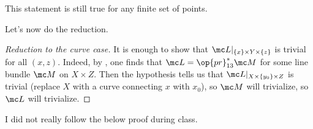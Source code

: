 \documentclass[../notes.tex]{subfiles}
\begin{document}
\begin{remark}
	This statement is still true for any finite set of points.
\end{remark}
Let's now do the reduction.
\begin{proof}[Reduction to the curve case]
	It is enough to show that $\mc L|_{\{x\}\times Y\times\{z\}}$ is trivial for all $(x,z)$. Indeed, by , one finds that $\mc L=\op{pr}_{13}^*\mc M$ for some line bundle $\mc M$ on $X\times Z$. Then the hypothesis tells us that $\mc L|_{X\times\{y_0\}\times Z}$ is trivial (replace $X$ with a curve connecting $x$ with $x_0$), so $\mc M$ will trivialize, so $\mc L$ will trivialize.
\end{proof}
\begin{warn}
	I did not really follow the below proof during class.
\end{warn}
\end{document}
